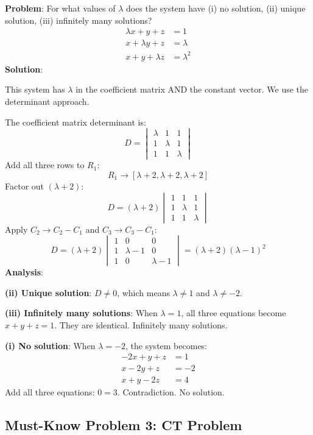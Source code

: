 \documentclass[
]{article}
\begin{document}
\textbf{Problem}: For what values of \(\lambda\) does the system have
(i) no solution, (ii) unique solution, (iii) infinitely many solutions?
\[
\begin{aligned}
\lambda x + y + z &= 1 \\
x + \lambda y + z &= \lambda \\
x + y + \lambda z &= \lambda^2
\end{aligned}
\]
\textbf{Solution}:

This system has \(\lambda\) in the coefficient matrix AND the constant
vector. We use the determinant approach.

The coefficient matrix determinant is:
\[
D =
\begin{vmatrix}
\lambda & 1 & 1 \\
1 & \lambda & 1 \\
1 & 1 & \lambda
\end{vmatrix}
\]
Add all three rows to \(R_1\):
\[
R_1 \to [\lambda + 2, \lambda + 2, \lambda + 2]
\]
Factor out \((\lambda + 2)\):
\[
D = (\lambda + 2)
\begin{vmatrix}
1 & 1 & 1 \\
1 & \lambda & 1 \\
1 & 1 & \lambda
\end{vmatrix}
\]
Apply \(C_2 \to C_2 - C_1\) and \(C_3 \to C_3 - C_1\):
\[
D = (\lambda + 2)
\begin{vmatrix}
1 & 0 & 0 \\
1 & \lambda - 1 & 0 \\
1 & 0 & \lambda - 1
\end{vmatrix} = (\lambda + 2)(\lambda - 1)^2
\]
\textbf{Analysis}:

\textbf{(ii) Unique solution}: \(D \neq 0\), which means
\(\lambda \neq 1\) and \(\lambda \neq -2\).

\textbf{(iii) Infinitely many solutions}: When \(\lambda = 1\), all
three equations become \(x + y + z = 1\). They are identical. Infinitely
many solutions.

\textbf{(i) No solution}: When \(\lambda = -2\), the system becomes:
\[
\begin{aligned}
-2x + y + z &= 1 \\
x - 2y + z &= -2 \\
x + y - 2z &= 4
\end{aligned}
\]
Add all three equations: \(0 = 3\). Contradiction. No solution.

\subsection{Must-Know Problem 3: CT
Problem}\label{must-know-problem-3-ct-problem}
\end{document}
